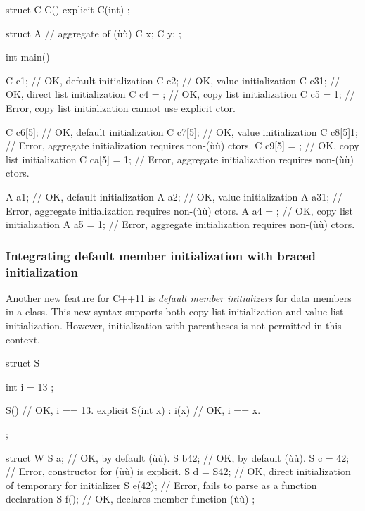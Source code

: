 \begin{emcppslisting}
struct C
{
    C() { }
    explicit C(int) { }
};

struct A  // aggregate of (ù{}ù)
{
    C x;
    C y;
};

int main()
{
    C c1;           // OK, default initialization
    C c2{};         // OK, value initialization
    C c3{1};        // OK, direct list initialization
    C c4 = {};      // OK, copy list initialization
    C c5 = {1};     // Error, copy list initialization cannot use explicit ctor.

    C c6[5];        // OK, default initialization
    C c7[5]{};      // OK, value initialization
    C c8[5]{1};     // Error, aggregate initialization requires non-(ù{}ù) ctors.
    C c9[5] = {};   // OK, copy list initialization
    C ca[5] = {1};  // Error, aggregate initialization requires non-(ù{}ù) ctors.

    A a1;           // OK, default initialization
    A a2{};         // OK, value initialization
    A a3{1};        // Error, aggregate initialization requires non-(ù{}ù) ctors.
    A a4 = {};      // OK, copy list initialization
    A a5 = {1};     // Error, aggregate initialization requires non-(ù{}ù) ctors.
}
\end{emcppslisting}


\subsubsection[Integrating default member initialization with braced initialization]{Integrating default member initialization with braced initialization}\label{integrating-default-member-initialization-with-braced-initialization}

Another new feature for C++11 is \emph{default member initializers} for
data members in a class. This new syntax supports both copy list
initialization and value list initialization. However, initialization
with parentheses is not permitted in this context.

\begin{emcppslisting}
struct S
{
    int i = { 13 };

    S() { }                       // OK, i == 13.
    explicit S(int x) : i(x) { }  // OK, i == x.
};


struct W
{
    S a{};        // OK, by default (ù{}ù).
    S b{42};      // OK, by default (ù{}ù).
    S c = {42};   // Error, constructor for (ù{}ù) is explicit.
    S d = S{42};  // OK, direct initialization of temporary for initializer
    S e(42);      // Error, fails to parse as a function declaration
    S f();        // OK, declares member function (ù{}ù)
};
\end{emcppslisting}


